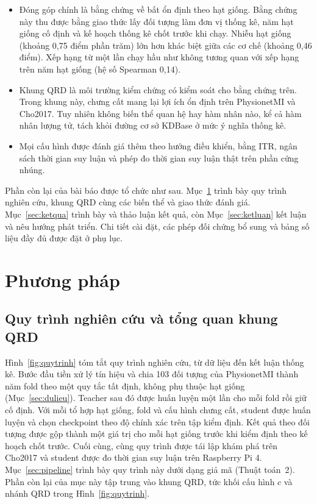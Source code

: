 \begin{itemize}
\item Đóng góp chính là bằng chứng về bất ổn định theo hạt giống. Bằng chứng này
thu được bằng giao thức lấy đối tượng làm đơn vị thống kê, năm hạt giống cố
định và kế hoạch thống kê chốt trước khi chạy. Nhiễu hạt giống (khoảng 0,75
điểm phần trăm) lớn hơn khác biệt giữa các cơ chế (khoảng 0,46 điểm). Xếp
hạng từ một lần chạy hầu như không tương quan với xếp hạng trên năm hạt
giống (hệ số Spearman 0,14).

\item Khung QRD là môi trường kiểm chứng có kiểm soát cho bằng chứng trên.
Trong khung này, chưng cất mang lại lợi ích ổn định trên PhysionetMI và
Cho2017. Tuy nhiên không biến thể quan hệ hay hàm nhân nào, kể cả hàm nhân
lượng tử, tách khỏi đường cơ sở KDBase ở mức ý nghĩa thống kê.

\item Mọi cấu hình được đánh giá thêm theo hướng điều khiển, bằng ITR, ngân
sách thời gian suy luận và phép đo thời gian suy luận thật trên phần cứng
nhúng.
\end{itemize}

Phần còn lại của bài báo được tổ chức như sau. Mục~\ref{sec:phuongphap}
trình bày quy trình nghiên cứu, khung QRD cùng các biến thể và giao thức
đánh giá. Mục~\ref{sec:ketqua} trình bày và thảo luận kết quả, còn
Mục~\ref{sec:ketluan} kết luận và nêu hướng phát triển. Chi tiết cài đặt,
các phép đối chứng bổ sung và bảng số liệu đầy đủ được đặt ở phụ lục.

\section{Phương pháp}
\label{sec:phuongphap}

\subsection{Quy trình nghiên cứu và tổng quan khung QRD}
\label{sec:tongquan}

Hình~\ref{fig:quytrinh} tóm tắt quy trình nghiên cứu, từ dữ liệu đến kết
luận thống kê. Bước đầu tiền xử lý tín hiệu và chia 103 đối tượng của
PhysionetMI thành năm fold theo một quy tắc tất định, không phụ thuộc hạt
giống (Mục~\ref{sec:dulieu}). Teacher sau đó được huấn luyện một lần cho
mỗi fold rồi giữ cố định. Với mỗi tổ hợp hạt giống, fold và cấu hình chưng
cất, student được huấn luyện và chọn checkpoint theo độ chính xác trên tập
kiểm định. Kết quả theo đối tượng được gộp thành một giá trị cho mỗi hạt
giống trước khi kiểm định theo kế hoạch chốt trước. Cuối cùng, cùng quy
trình được tái lập khám phá trên Cho2017 và student được đo thời gian suy
luận trên Raspberry Pi 4. Mục~\ref{sec:pipeline} trình bày quy trình này
dưới dạng giả mã (Thuật toán~2). Phần còn lại của mục này tập trung vào
khung QRD, tức khối cấu hình $c$ và nhánh QRD trong Hình~\ref{fig:quytrinh}.

